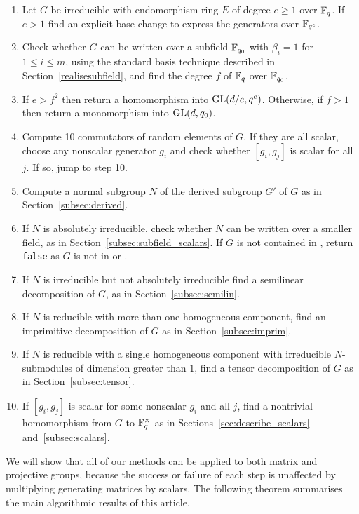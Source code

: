 \begin{enumerate}
\item Let $G$ be irreducible with endomorphism ring $E$ of degree $e
\geq 1$ over $\mathbb{F}_q$. If $e > 1$ find an explicit base change to express
the generators over $\mathbb{F}_{q^e}$.
\item Check whether $G$ can be written over 
a subfield $\mathbb{F}_{q_0}$ with $\beta_i = 1$ for $1 \leq i \leq m$, 
using the standard basis 
technique described in Section~\ref{realisesubfield}, and find the
degree $f$ of $\mathbb{F}_q$ over  $\mathbb{F}_{q_0}$.
\item If $e > f^2$ then  return a homomorphism into $\GL(d/e, q^e)$. 
Otherwise, if $f > 1$ then return a monomorphism into $\GL(d, q_0)$.
\item Compute 10 commutators of random elements of $G$. If they are all 
scalar, choose any nonscalar generator $g_i$  and check whether 
$[g_i, g_j]$ is scalar for all $j$. If so, 
jump to step 10. 
\item Compute a normal subgroup $N$ of the derived 
subgroup $G'$ of $G$ as in Section~\ref{subsec:derived}. 
\item If $N$ is absolutely irreducible, check 
whether $N$ can be written over a smaller field, as in
 Section~\ref{subsec:subfield_scalars}. If $G$ is not contained in
, return {\tt false} as $G$ is not in  or .
\item If $N$ is irreducible but not absolutely 
irreducible find a semilinear decomposition 
of $G$, as in Section~\ref{subsec:semilin}.
\item If $N$ is reducible with more than one 
homogeneous component, find an imprimitive 
decomposition of $G$ as in  
Section~\ref{subsec:imprim}.
\item If $N$ is reducible with a single 
homogeneous component with irreducible $N$-submodules of
dimension greater than $1$, find a tensor
decomposition of $G$ as in
Section~\ref{subsec:tensor}. 
\item If $[g_i, g_j]$ is scalar for some nonscalar $g_i$ and all $j$, find 
a nontrivial homomorphism from $G$ to $\mathbb{F}_q^\times$ as in
 Sections~\ref{sec:describe_scalars} and~\ref{subsec:scalars}. 
\end{enumerate}


We will show that all of our methods
can be applied to both matrix and projective groups, 
because the success or failure of each step is unaffected 
by multiplying generating matrices by scalars. 
The following theorem summarises the main 
algorithmic results of this article.

